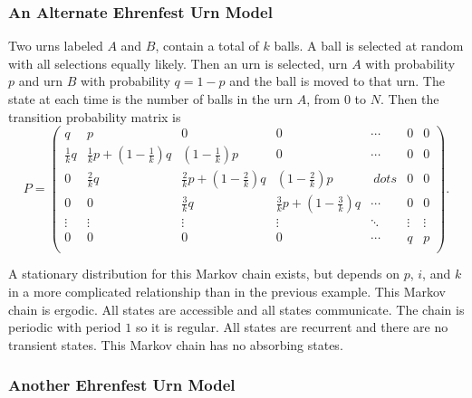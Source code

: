 \documentclass[12pt]{article}
\begin{document}
\subsubsection*{An Alternate Ehrenfest Urn Model}

Two urns labeled \( A \) and \( B \), contain a total of \( k \) balls.
A ball is selected at random with all selections equally likely.  Then
an urn is selected, urn \( A \) with probability \( p \) and urn \( B \)
with probability \( q = 1-p \) and the ball is moved to that urn.  The
state at each time is the number of balls in the urn \( A \), from \( 0 \)
to \( N \).  Then the transition probability matrix is
\[
    P =
    \begin{pmatrix}
        q & p & 0 & 0 & \cdots & 0 & 0 \\
        \frac{1}{k} q & \frac{1}{k}p + \left( 1-\frac{1}{k} \right) q &\left
        (1-\frac{1}{k} \right) p & 0 & \cdots & 0 & 0 \\
        0 & \frac{2}{k} q &\frac{2}{k} p + \left( 1-\frac{2}{k} \right)
        q &\left( 1-\frac{2}{k} \right) p & \ dots & 0 & 0 \\
        0 & 0 & \frac{3}{k} q & \frac{3}{k} p + \left( 1-\frac{3}{k}
        \right) q & \cdots & 0 & 0 \\
        \vdots & \vdots & \vdots & \vdots & \ddots & \vdots & \vdots \\
        0 & 0 & 0 & 0 & \cdots & q & p \\
    \end{pmatrix}
    .
\]

A stationary distribution for this Markov chain exists, but depends on \(
p \), \( i \), and \( k \) in a more complicated relationship than in
the previous example.  This Markov chain is ergodic.  All states are
accessible and all states communicate.  The chain is periodic with
period \( 1 \) so it is regular.  All states are recurrent and there are
no transient states.  This Markov chain has no absorbing states.

\subsubsection*{Another Ehrenfest Urn Model}
\end{document}
